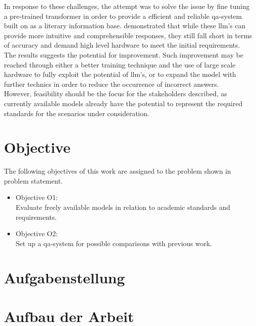 In response to these challenges, the attempt was to solve the issue by fine tuning a pre-trained transformer in order to provide a efficient and reliable \ac{qa}-system built on \citet{bb2} as a literary information base.
\citet{Paul_Keller} demonstrated that while these \ac{llm}'s can provide more intuitive and comprehensible responses, they still fall short in terms of accuracy and demand high level hardware to meet the initial requirements.\\ 
%
The results suggests the potential for improvement. 
Such improvement may be reached through either a better training technique and the use of large scale hardware to fully exploit the potential of \ac{llm}'s, or to expand the model with further technics in order to reduce the occurrence of incorrect answers.\\
%
However, feasibility should be the focus for the stakeholders described, as currently available models already have the potential to represent the required standards for the scenarios under consideration. 
 
\section{Objective}\label{sec:objective}
The following objectives of this work are assigned to the problem shown in {problem statement}.
\begin{itemize}
  \item Objective O1:\\ 
  Evaluate freely available models in relation to academic standards and requirements.
  \item Objective O2:\\ 
  Set up a \ac{qa}-system for possible comparisons with previous work.
\end{itemize}
\section{Aufgabenstellung}



\section{Aufbau der Arbeit}
